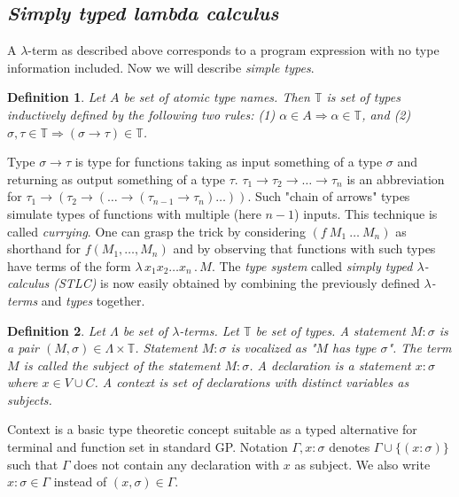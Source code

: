 \documentclass[11pt]{article}
\newtheorem{definition}{Definition}
\newcommand{\lterm}{$\lambda$-term\xspace}
\newcommand{\lterms}{$\lambda$-terms\xspace}
\newcommand{\then}{\Rightarrow\xspace}
\newcommand{\lam}[2]{\lambda \, #1 \, . \, #2}
\newcommand{\ar}{\rightarrow\xspace}
\newcommand{\T}{\mathbb{T}\xspace}
\begin{document}
\begin{article}
\subsection{\textit{Simply typed lambda calculus}}

A \lterm as described above corresponds to a program expression with no type information included. Now we will describe \textit{simple types}. 

\begin{definition}
Let $A$ be set of {\it atomic type names}. 
Then $\mathbb{T}$ is set of {\it types} inductively defined by the following two rules:
(1) $\alpha      \in A  \then   \alpha \in \T$, and
(2) $\sigma,\tau \in \T \then ( \sigma \ar  \tau ) \in \T$.
\end{definition}

Type $\sigma \ar \tau$ is type for functions taking as input
something of a type $\sigma$ and returning 
as output something of a type $\tau$. 
$\tau_1 \ar \tau_2 \ar \dots \ar \tau_n$ is an abbreviation for 
$\tau_1 \ar (\tau_2 \ar (\dots \ar (\tau_{n-1} \ar \tau_n)\dots))$. Such "chain of arrows" types simulate types of functions with multiple (here $n-1$) inputs. 
This technique is called \textit{currying}. One can grasp the trick by considering $(f~M_1~\dots~M_n)$ as shorthand for $f(M_1,\dots,M_n)$
and by observing that functions with such types have terms of the form $\lam{x_1 x_2 \dots x_n }{M}$. 
The \textit{type system} called \textit{simply typed $\lambda$-calculus (STLC)} is now easily obtained by combining the previously defined \textit{\lterms} and \textit{types} together. 

\begin{definition} Let $\Lambda$ be set of {\it \lterms}. 
	Let $\mathbb{T}$ be set of {\it types}.       
	A {\it statement} $M : \sigma$ is a pair 
	$(M,\sigma) \in \Lambda \times \mathbb{T}$.
	Statement $M : \sigma$ is vocalized as 
	{\it "$M$ has type $\sigma$"}.
	The term $M$ is called the {\it subject} of the 
	statement $M : \sigma$.
A \textit{declaration} is a statement 
 $x : \sigma$ where $x \in V \cup C$.
A \textit{context} 
 is set of declarations with distinct variables as subjects.
\end{definition}



Context is a basic type theoretic concept suitable as a typed alternative
for terminal and function set in standard GP. 
Notation $\Gamma,x:\sigma $ denotes $ \Gamma\cup\{(x:\sigma)\}$ 
such that $\Gamma$ does not contain any declaration with $x$ as subject.
We also write $x:\sigma \in \Gamma$ instead of $(x,\sigma) \in \Gamma$.



\end{article}
\end{document}
